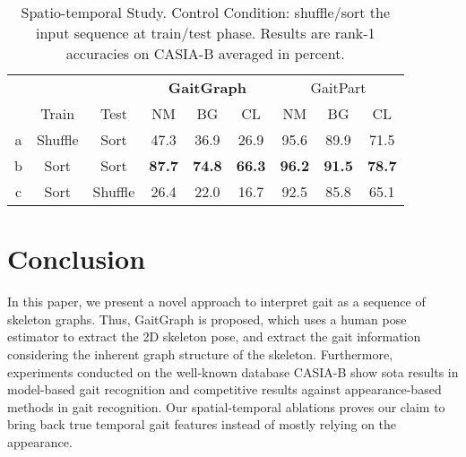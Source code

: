 \documentclass{article}
\begin{document}
\begin{table}
 \caption{Spatio-temporal Study. Control Condition: shuffle/sort the input sequence at train/test phase. Results are rank-1 accuracies on CASIA-B averaged in percent.}
 \label{tab:temp-ablation}
\setlength{\tabcolsep}{5pt}
\fontsize{9}{11}\selectfont
 \centering
 
 \begin{tabularx}{.985\linewidth}{c | c c | c c c | c c c }
 \toprule
     & \multicolumn{2}{c|}{} & \multicolumn{3}{c|}{\textbf{GaitGraph}} & \multicolumn{3}{c}{GaitPart\cite{fan2020gaitpart}} \\
     & Train & Test & NM & BG & CL & NM & BG & CL\\
    \hline
    a & Shuffle & Sort & 47.3 & 36.9 & 26.9 & 95.6 & 89.9 & 71.5\\
    b & Sort & Sort & \textbf{87.7} & \textbf{74.8} & \textbf{66.3} & \textbf{96.2} & \textbf{91.5} & \textbf{78.7}\\
    c & Sort & Shuffle & 26.4 & 22.0 & 16.7 & 92.5 & 85.8 & 65.1\\
 \bottomrule
\end{tabularx}
\end{table}


\section{Conclusion}
In this paper, we present a novel approach to interpret gait as a sequence of skeleton graphs. Thus, GaitGraph is proposed, which uses a human pose estimator to extract the 2D skeleton pose, and extract the gait information considering the inherent graph structure of the skeleton.
Furthermore, experiments conducted on the well-known database CASIA-B \cite{yu2006framework} show \gls{sota} results in model-based gait recognition and competitive results against appearance-based methods in gait recognition. Our spatial-temporal ablations proves our claim to bring back true temporal gait features instead of mostly relying on the appearance. 


\vfill
\pagebreak



\end{document}
